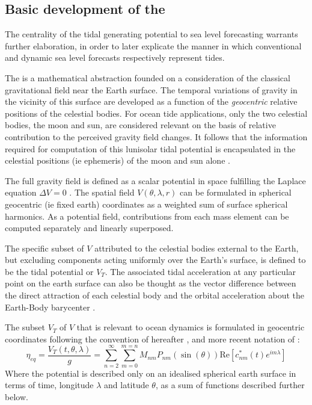 \subsection{Basic development of the \ATGP{}}  \label{sec:basic_potential}
The centrality of the tidal generating potential to sea level forecasting warrants further elaboration, in order to later explicate the manner in which conventional and dynamic sea level forecasts respectively represent tides. 

The \ATGP{} is a mathematical abstraction founded on a consideration of the classical gravitational field near the Earth surface. The temporal variations of gravity in the vicinity of this surface are developed as a function of the \emph{geocentric} relative positions of the celestial bodies.
For ocean tide applications, only the two celestial bodies, the moon and sun, are considered relevant on the basis of relative contribution to the perceived gravity field changes. It follows that the information required for computation of this lunisolar tidal potential is encapsulated in the celestial positions (ie ephemeris) of the moon and sun alone \citep{Agnew:2011ub}.


The full gravity field is defined as a scalar potential in space fulfilling the Laplace equation $\Delta V=0$ \citep[sec 5.3.1]{Urban:2013vl}.  The spatial field $V(\theta,\lambda,r)$ can be formulated in spherical geocentric (ie fixed earth) coordinates as a weighted sum of surface spherical harmonics. As a potential field, contributions from each mass element can be computed separately and linearly superposed.

The specific subset of $V$ attributed to the celestial bodies external to the Earth, but excluding components acting uniformly over the Earth's surface, is defined to be the tidal potential \ATGP{} or $V_T$.
The associated tidal acceleration at any particular point on the earth surface can also be thought as the vector difference between the direct attraction of each celestial body and the orbital acceleration about the Earth-Body barycenter \citep{Wenzel:1997kn}.


The subset $V_T$ of $V$ that is relevant to ocean dynamics is formulated in geocentric coordinates following the convention of \cite{Cartwright:1973em} hereafter \CTE{}, and more recent notation of \cite{Desai:2006wo}:
\begin{equation}
    \eta_{eq} = \frac{V_T(t,\theta,\lambda) }{g} = \sum_{n=2}^{\infty} \sum_{m=0}^{m=n} M_{nm} P_{nm}( \sin(\theta) ) \text{Re} \left [ c^{*}_{nm}(t) e^{im\lambda} \right ]
    \label{eq:VT}
\end{equation}
Where the potential is described only on an idealised spherical earth surface in terms of time, longitude $\lambda$ and latitude $\theta$, as a sum of functions described further below. 

